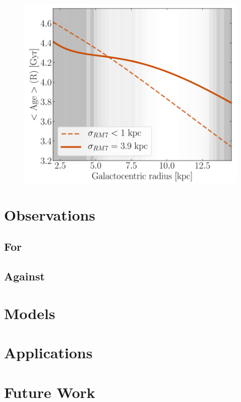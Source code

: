 \documentclass[preprint2]{aastex631}
\begin{document}
\begin{figure}[htb]
    \centering
    \includegraphics[width=\columnwidth]{frankel2019_fig12.png}
    \caption{}
\end{figure}

\section{Observations}
\subsection{For}
\citep{vanDokkum+2013}
\subsection{Against}
\citep{Goddard+2017}

\section{Models}
\citep{Frankel+2019}

\section{Applications}
\citep{Banerjee+2020}

\section{Future Work}
\citep{Hogg+2019}
\end{document}
